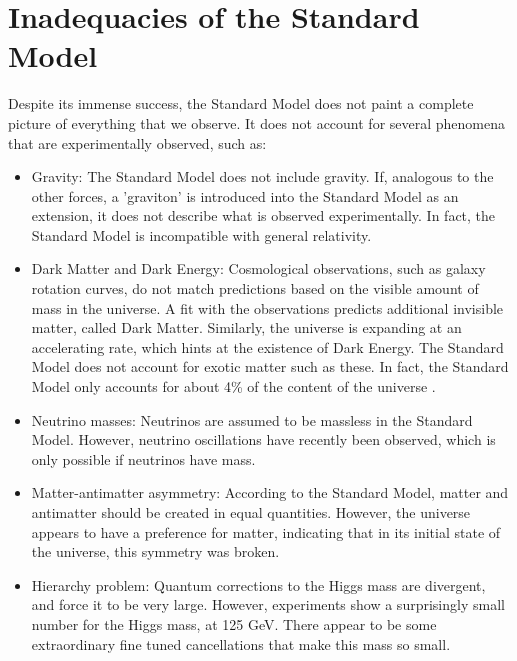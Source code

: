 \documentclass[11pt,a4paper,openright,twoside]{report}
\begin{document}
\section{Inadequacies of the Standard Model}
Despite its immense success, the Standard Model does not paint a complete picture of everything that we observe. It does not account for several phenomena that are experimentally observed, such as:
\begin{itemize}
\item Gravity: The Standard Model does not include gravity. If, analogous to the other forces, a 'graviton' is introduced into the Standard Model as an extension, it does not describe what is observed experimentally. In fact, the Standard Model is incompatible with general relativity\cite{grav_inc}.

\item Dark Matter and Dark Energy: Cosmological observations, such as galaxy rotation curves, do not match predictions based on the visible amount of mass in the universe. A fit with the observations predicts additional invisible matter, called Dark Matter\cite{DM_inc}. Similarly, the universe is expanding at an accelerating rate, which hints at the existence of Dark Energy\cite{DE}. The Standard Model does not account for exotic matter such as these. In fact, the Standard Model only accounts for about 4\% of the content of the universe \cite{Planck,DM_comp}.

\item Neutrino masses: Neutrinos are assumed to be massless in the Standard Model. However, neutrino oscillations have recently been observed\cite{neutrino2}, which is only possible if neutrinos have mass\cite{neutrino_mass}.

\item Matter-antimatter asymmetry: According to the Standard Model, matter and antimatter should be created in equal quantities. However, the universe appears to have a preference for matter, indicating that in its initial state of the universe, this symmetry was broken\cite{Baryon_Asymmetry}.

\item Hierarchy problem\cite{hierarchy1,hierarchy2,hierarchy3,hierarchy4}: Quantum corrections to the Higgs mass are divergent, and force it to be very large. However, experiments show a surprisingly small number for the Higgs mass, at 125 GeV. There appear to be some extraordinary fine tuned cancellations that make this mass so small.
\end{itemize}
\end{document}

